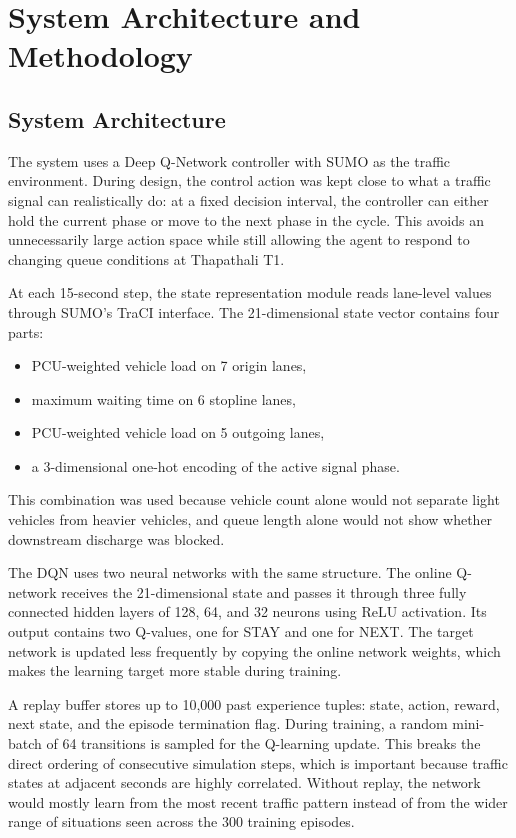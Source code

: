 \chapter{System Architecture and Methodology}
\label{chap:system_architecture_methodology}

\section{System Architecture}
\label{sec:system_architecture}

The system uses a Deep Q-Network controller with SUMO as the traffic environment. During design, the control action was kept close to what a traffic signal can realistically do: at a fixed decision interval, the controller can either hold the current phase or move to the next phase in the cycle. This avoids an unnecessarily large action space while still allowing the agent to respond to changing queue conditions at Thapathali T1.

At each 15-second step, the state representation module reads lane-level
values through SUMO's TraCI interface. The 21-dimensional state vector
contains four parts:

\begin{itemize}
    \item PCU-weighted vehicle load on 7 origin lanes,
    \item maximum waiting time on 6 stopline lanes,
    \item PCU-weighted vehicle load on 5 outgoing lanes,
    \item a 3-dimensional one-hot encoding of the active signal phase.
\end{itemize}

This combination was used because vehicle count alone would not separate
light vehicles from heavier vehicles, and queue length alone would not
show whether downstream discharge was blocked.

The DQN uses two neural networks with the same structure. The online Q-network receives the 21-dimensional state and passes it through three fully connected hidden layers of 128, 64, and 32 neurons using ReLU activation. Its output contains two Q-values, one for STAY and one for NEXT. The target network is updated less frequently by copying the online network weights, which makes the learning target more stable during training.

A replay buffer stores up to 10,000 past experience tuples: state, action, reward, next state, and the episode termination flag. During training, a random mini-batch of 64 transitions is sampled for the Q-learning update. This breaks the direct ordering of consecutive simulation steps, which is important because traffic states at adjacent seconds are highly correlated. Without replay, the network would mostly learn from the most recent traffic pattern instead of from the wider range of situations seen across the 300 training episodes.

